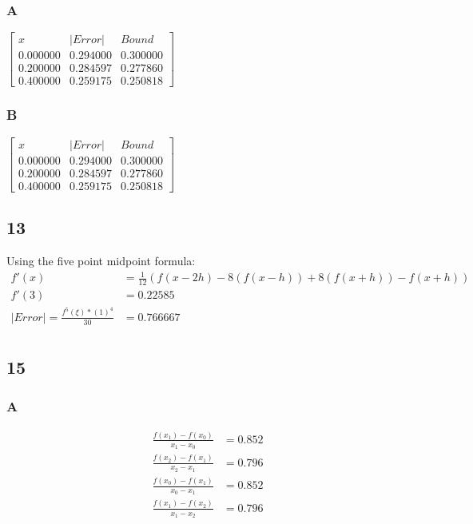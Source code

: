 \documentclass{oisinclass}
\begin{document}
\subsubsection*{A}
\(
\begin{bmatrix}
	x        & |Error|  & Bound    \\
	0.000000 & 0.294000 & 0.300000 \\
	0.200000 & 0.284597 & 0.277860 \\
	0.400000 & 0.259175 & 0.250818
\end{bmatrix}
\)

\subsubsection*{B}
\(
\begin{bmatrix}
	x        & |Error|  & Bound    \\
	0.000000 & 0.294000 & 0.300000 \\
	0.200000 & 0.284597 & 0.277860 \\
	0.400000 & 0.259175 & 0.250818
\end{bmatrix}
\)

\subsection*{13}
Using the five point midpoint formula:
\begin{align*}
	f'(x)                                 & = \frac{1}{12}\left(f(x - 2h) - 8(f(x-h)) + 8 (f(x+h)) - f(x+h)\right) \\
	f'(3)                                 & = 0.22585                                                              \\
	|Error| = \frac{f^5(\xi) * (1)^4}{30} & = 0.766667                                                             \\
\end{align*}

\subsection*{15}
\subsubsection*{A}
\begin{align*}
	\frac{f(x_1) - f(x_0)}{x_1 - x_0} & = 0.852 \\
	\frac{f(x_2) - f(x_1)}{x_2 - x_1} & = 0.796 \\[3.5ex]
	\frac{f(x_0) - f(x_1)}{x_0 - x_1} & = 0.852 \\
	\frac{f(x_1) - f(x_2)}{x_1 - x_2} & = 0.796 \\
\end{align*}
\end{document}
